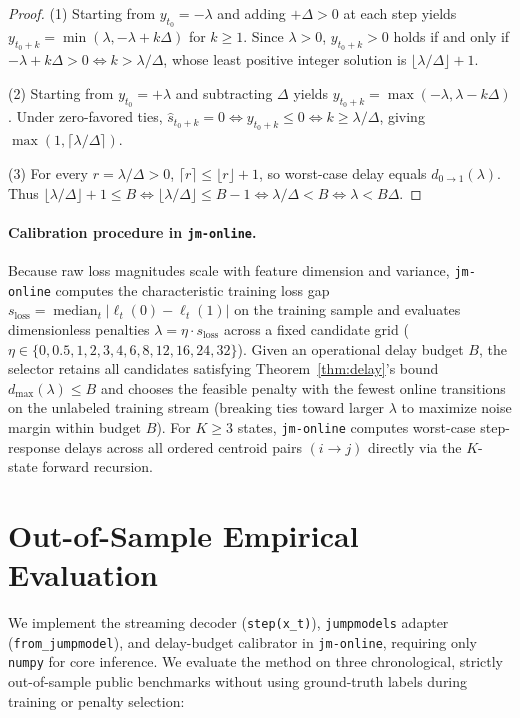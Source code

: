 \documentclass[11pt]{article}
\begin{document}
\begin{proof}
(1) Starting from $y_{t_0} = -\lambda$ and adding $+\Delta > 0$ at each step yields $y_{t_0+k} = \min(\lambda, -\lambda + k\Delta)$ for $k \ge 1$. Since $\lambda > 0$, $y_{t_0+k} > 0$ holds if and only if $-\lambda + k\Delta > 0 \iff k > \lambda/\Delta$, whose least positive integer solution is $\lfloor \lambda/\Delta \rfloor + 1$.

(2) Starting from $y_{t_0} = +\lambda$ and subtracting $\Delta$ yields $y_{t_0+k} = \max(-\lambda, \lambda - k\Delta)$. Under zero-favored ties, $\hat{s}_{t_0+k} = 0 \iff y_{t_0+k} \le 0 \iff k \ge \lambda/\Delta$, giving $\max(1, \lceil \lambda/\Delta \rceil)$.

(3) For every $r = \lambda/\Delta > 0$, $\lceil r \rceil \le \lfloor r \rfloor + 1$, so worst-case delay equals $d_{0\to 1}(\lambda)$. Thus $\lfloor \lambda/\Delta \rfloor + 1 \le B \iff \lfloor \lambda/\Delta \rfloor \le B - 1 \iff \lambda/\Delta < B \iff \lambda < B\Delta$.
\end{proof}

\paragraph{Calibration procedure in \texttt{jm-online}.}
Because raw loss magnitudes scale with feature dimension and variance, \texttt{jm-online} computes the characteristic training loss gap $s_{\mathrm{loss}} = \operatorname{median}_t |\ell_t(0) - \ell_t(1)|$ on the training sample and evaluates dimensionless penalties $\lambda = \eta \cdot s_{\mathrm{loss}}$ across a fixed candidate grid ($\eta \in \{0, 0.5, 1, 2, 3, 4,\allowbreak 6, 8, 12, 16, 24, 32\}$). Given an operational delay budget $B$, the selector retains all candidates satisfying Theorem~\ref{thm:delay}'s bound $d_{\max}(\lambda) \le B$ and chooses the feasible penalty with the fewest online transitions on the unlabeled training stream (breaking ties toward larger $\lambda$ to maximize noise margin within budget $B$). For $K \ge 3$ states, \texttt{jm-online} computes worst-case step-response delays across all ordered centroid pairs $(i \to j)$ directly via the $K$-state forward recursion.

\section{Out-of-Sample Empirical Evaluation}
\label{sec:experiments}

We implement the streaming decoder (\texttt{step(x\_t)}), \texttt{jumpmodels} adapter (\texttt{from\_jumpmodel}), and delay-budget calibrator in \texttt{jm-online}, requiring only \texttt{numpy} for core inference. We evaluate the method on three chronological, strictly out-of-sample public benchmarks without using ground-truth labels during training or penalty selection:
\end{document}
